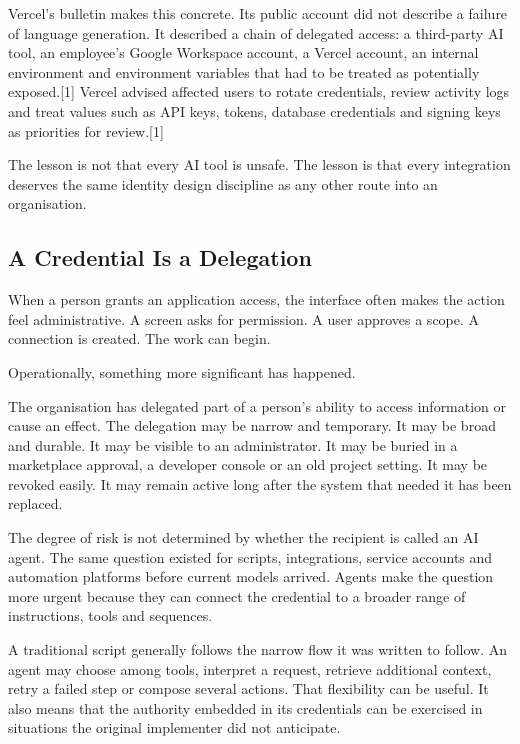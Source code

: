 Vercel's bulletin makes this concrete. Its public account did not
describe a failure of language generation. It described a chain of
delegated access: a third-party AI tool, an employee's Google Workspace
account, a Vercel account, an internal environment and environment
variables that had to be treated as potentially exposed.{[}1{]} Vercel
advised affected users to rotate credentials, review activity logs and
treat values such as API keys, tokens, database credentials and signing
keys as priorities for review.{[}1{]}

The lesson is not that every AI tool is unsafe. The lesson is that every
integration deserves the same identity design discipline as any other
route into an organisation.

\subsection{A Credential Is a
Delegation}\label{a-credential-is-a-delegation}

When a person grants an application access, the interface often makes
the action feel administrative. A screen asks for permission. A user
approves a scope. A connection is created. The work can begin.

Operationally, something more significant has happened.

The organisation has delegated part of a person's ability to access
information or cause an effect. The delegation may be narrow and
temporary. It may be broad and durable. It may be visible to an
administrator. It may be buried in a marketplace approval, a developer
console or an old project setting. It may be revoked easily. It may
remain active long after the system that needed it has been replaced.

The degree of risk is not determined by whether the recipient is called
an AI agent. The same question existed for scripts, integrations,
service accounts and automation platforms before current models arrived.
Agents make the question more urgent because they can connect the
credential to a broader range of instructions, tools and sequences.

A traditional script generally follows the narrow flow it was written to
follow. An agent may choose among tools, interpret a request, retrieve
additional context, retry a failed step or compose several actions. That
flexibility can be useful. It also means that the authority embedded in
its credentials can be exercised in situations the original implementer
did not anticipate.

